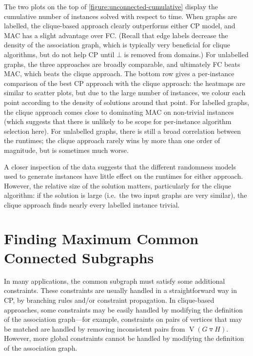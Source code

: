 \documentclass{llncs}
\newcommand{\modularproduct}{\operatorname{\triangledown}}
\begin{document}
The two plots on the top of \cref{figure:unconnected-cumulative} display the cumulative number of
instances solved with respect to time.  When graphs are labelled, the clique-based approach clearly
outperforms either CP model, and MAC has a slight advantage over FC. (Recall that edge labels
    decrease the density of the association graph, which is typically very beneficial for clique
algorithms, but do not help CP until $\bot$ is removed from domains.) For unlabelled graphs, the
three approaches are broadly comparable, and ultimately FC beats MAC, which beats the clique
approach. The bottom row gives a per-instance comparison of the best CP approach with the clique
approach: the heatmaps are similar to scatter plots, but due to the large number of instances, we
colour each point according to the density of solutions around that point. For labelled graphs, the
clique approach comes close to dominating MAC on non-trivial instances (which suggests that there is
unlikely to be scope for per-instance algorithm selection here). For unlabelled graphs, there is
still a broad correlation between the runtimes; the clique approach rarely wins by more than one
order of magnitude, but is sometimes much worse.

A closer inspection of the data suggests that the different randomness models used to generate
instances have little effect on the runtimes for either approach. However, the relative size of the
solution matters, particularly for the clique algorithm: if the solution is large (i.e.\ the two
input graphs are very similar), the clique approach finds nearly every labelled instance trivial.

\section{Finding Maximum Common Connected Subgraphs}\label{mccs}

In many applications, the common subgraph must satisfy some additional constraints. These
constraints are usually handled in a straightforward way in CP, by branching rules and/or constraint
propagation. In clique-based approaches, some constraints may be easily handled by modifying the
definition of the association graph---for example, constraints on pairs of vertices that may be
matched are handled by removing inconsistent pairs from $\operatorname{V}(G \modularproduct H)$.
However, more global constraints cannot be handled by modifying the definition of the association
graph.
\end{document}

